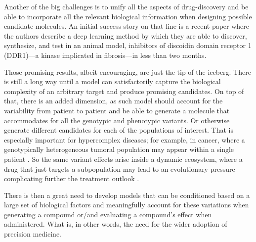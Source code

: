 \documentclass{article}
\begin{document}


Another of the big challenges is to unify all the aspects of drug-discovery and be able
 to incorporate all the relevant biological information when designing possible
 candidate molecules. An initial success story on that line is a recent paper
 \cite{Zhavoronkov2019} where the authors describe a deep learning method by which they
 are able to discover, synthesize, and test in an animal model, inhibitors of discoidin
 domain receptor 1 (DDR1)—a kinase implicated in fibrosis—in less than two months.

Those promising results, albeit encouraging, are just the tip of the iceberg. There is
still a long way until a model can satisfactorily capture the biological complexity of
an arbitrary target and produce promising candidates. On top of that, there is an added
dimension, as such model should account for the variability from patient to patient and
be able to generate a molecule that accommodates for all the genotypic and phenotypic
variants. Or otherwise generate different candidates for each of the populations of
interest. That is especially important for hypercomplex diseases; for example, in
cancer, where a genotypically heterogeneous tumoral population may appear within a
single patient \cite{Boland2017}. So the same variant effects arise inside a dynamic
ecosystem, where a drug that just targets a subpopulation may lead to an evolutionary
pressure complicating further the treatment outlook \cite{Enriquez-Navas2015}.

There is then a great need to develop models that can be conditioned based on a large
set of biological factors and meaningfully account for these variations when generating
a compound or/and evaluating a compound's effect when administered. What is, in other
words, the need for the wider adoption of precision medicine.
\end{document}

